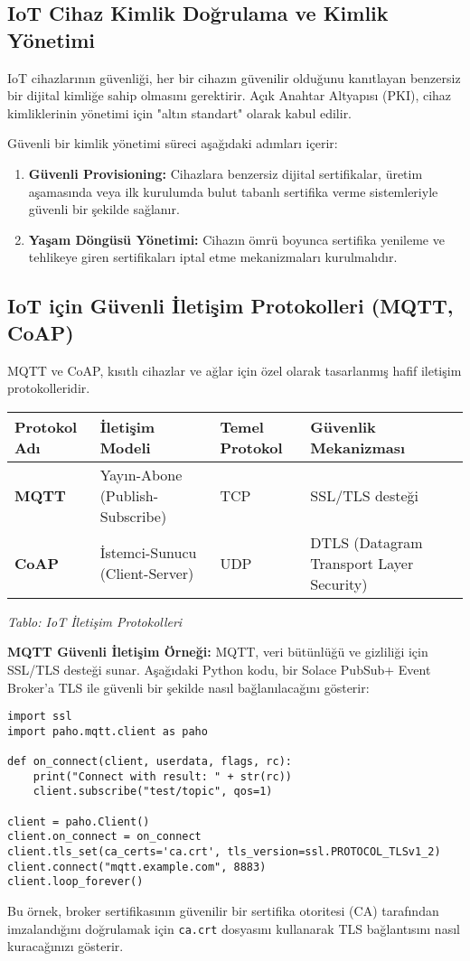 \subsection{IoT Cihaz Kimlik Doğrulama ve Kimlik Yönetimi}

IoT cihazlarının güvenliği, her bir cihazın güvenilir olduğunu kanıtlayan benzersiz bir dijital kimliğe sahip olmasını gerektirir. Açık Anahtar Altyapısı (PKI), cihaz kimliklerinin yönetimi için "altın standart" olarak kabul edilir.

Güvenli bir kimlik yönetimi süreci aşağıdaki adımları içerir:
\begin{enumerate}
    \item \textbf{Güvenli Provisioning:} Cihazlara benzersiz dijital sertifikalar, üretim aşamasında veya ilk kurulumda bulut tabanlı sertifika verme sistemleriyle güvenli bir şekilde sağlanır.
    \item \textbf{Yaşam Döngüsü Yönetimi:} Cihazın ömrü boyunca sertifika yenileme ve tehlikeye giren sertifikaları iptal etme mekanizmaları kurulmalıdır.
\end{enumerate}

\subsection{IoT için Güvenli İletişim Protokolleri (MQTT, CoAP)}

MQTT ve CoAP, kısıtlı cihazlar ve ağlar için özel olarak tasarlanmış hafif iletişim protokolleridir.

\begin{tabularx}{\textwidth}{|l|X|X|X|}
\hline
\textbf{Protokol Adı} & \textbf{İletişim Modeli} & \textbf{Temel Protokol} & \textbf{Güvenlik Mekanizması} \\
\hline
\textbf{MQTT} & Yayın-Abone (Publish-Subscribe) & TCP & SSL/TLS desteği \\
\hline
\textbf{CoAP} & İstemci-Sunucu (Client-Server) & UDP & DTLS (Datagram Transport Layer Security) \\
\hline
\end{tabularx}


\textit{Tablo: IoT İletişim Protokolleri}

\textbf{MQTT Güvenli İletişim Örneği:}
MQTT, veri bütünlüğü ve gizliliği için SSL/TLS desteği sunar. Aşağıdaki Python kodu, bir Solace PubSub+ Event Broker'a TLS ile güvenli bir şekilde nasıl bağlanılacağını gösterir:
\begin{lstlisting}[breaklines=true,basicstyle=\ttfamily\footnotesize]
import ssl
import paho.mqtt.client as paho

def on_connect(client, userdata, flags, rc):
    print("Connect with result: " + str(rc))
    client.subscribe("test/topic", qos=1)

client = paho.Client()
client.on_connect = on_connect
client.tls_set(ca_certs='ca.crt', tls_version=ssl.PROTOCOL_TLSv1_2)
client.connect("mqtt.example.com", 8883)
client.loop_forever()
\end{lstlisting}
Bu örnek, broker sertifikasının güvenilir bir sertifika otoritesi (CA) tarafından imzalandığını doğrulamak için \verb|ca.crt| dosyasını kullanarak TLS bağlantısını nasıl kuracağınızı gösterir.

